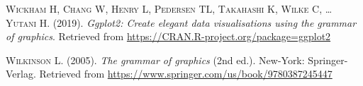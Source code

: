 \documentclass[a4paperpaper,]{article}
\begin{document}
\hypertarget{refs}{}
\leavevmode\hypertarget{ref-R-ggplot2}{}%
\textsc{Wickham H, Chang W, Henry L, Pedersen TL, Takahashi K, Wilke C, \ldots{} Yutani H}. (2019). \emph{Ggplot2: Create elegant data visualisations using the grammar of graphics}. Retrieved from \url{https://CRAN.R-project.org/package=ggplot2}

\leavevmode\hypertarget{ref-wilkinson2005}{}%
\textsc{Wilkinson L}. (2005). \emph{The grammar of graphics} (2nd ed.). New-York: Springer-Verlag. Retrieved from \url{https://www.springer.com/us/book/9780387245447}
\end{document}
